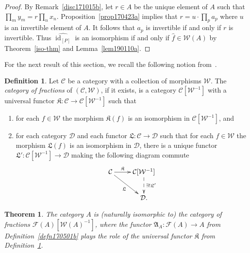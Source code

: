 \documentclass[reqno]{amsart}
\theoremstyle{plain}
\newtheorem{thm}[lem]{Theorem}
\theoremstyle{definition}
\newtheorem{defn}[lem]{Definition}
\newcommand{\cat}[1]{\mathcal{#1}}
\newcommand{\catw}{\cat{W}}
\newcommand{\catf}{\cat{F}}
\newcommand{\catc}{\cat{C}}
\newcommand{\catd}{\cat{D}}
\newcommand{\id}{\operatorname{id}}
\numberwithin{equation}{lem}
\begin{document}
\begin{proof}
By Remark~\ref{disc171015b}, let $r\in A$ be the unique element of $A$ such that $\prod_my_m=r\prod_nx_n$.
Proposition~\ref{prop170423a} implies that $r=u\cdot\prod_pa_p$
where $u$ is an invertible element of $A$.
It follows that 
$a_p$ is invertible if and only if $r$ is invertible.
Thus $\widehat{\id_{[P]}}$ is an 
isomorphism if and only if $\hat f\in\catw(A)$ by Theorem~\ref{iso-thm} and Lemma~\ref{lem190110a}.
\end{proof}


For the next
result of this section, we recall the following notion from~\cite{MR0210125}.

\begin{defn}
\label{defn170501a}
Let $\catc$ be a category with a collection of 
morphisms
$\catw$. 
The 
\emph{category of fractions}
of $(\catc,\catw)$, if it exists, is a category $\catc[\catw^{-1}]$
with a universal functor $\mathfrak K\colon\catc\to\catc[\catw^{-1}]$
such that
\begin{enumerate}[(1)]
\item \label{defn170501a1}
for each $f\in\catw$ the morphism $\mathfrak K(f)$ is an isomorphism in $\catc[\catw^{-1}]$,
and
\item \label{defn170501a2}
for each category $\catd$ and each functor $\mathfrak L\colon \catc\to\catd$ such that for each $f\in\catw$ the 
morphism $\mathfrak L(f)$ is an isomorphism in $\catd$,
there is a unique functor $\mathfrak L'\colon\catc[\catw^{-1}]
\to\catd$ making the following diagram commute
$$\xymatrix{
\catc\ar[r]^-{\mathfrak K}\ar[rd]_{\mathfrak L}
&\catc[\catw^{-1}]
\ar@{-->}[d]^{\exists !\mathfrak L'}
\\
&\catd.}$$
\end{enumerate}
\end{defn}

\begin{thm}\label{thm170501a}
The category $A$ is (naturally isomorphic to) the 
category of fractions 
$\catf(A)[\catw(A)^{-1}]$,
where the
functor $\mathfrak A_A\colon\catf(A)\to A$ from Definition~\ref{defn170501b} plays the role of the
universal functor $\mathfrak K$ from Definition~\ref{defn170501a}.
\end{thm}
\end{document}
